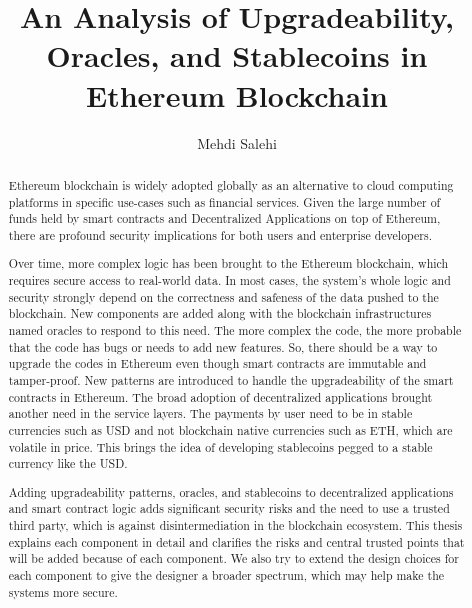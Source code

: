 \documentclass[letterpaper,12pt,onecolumn,final]{report}
\author{Mehdi Salehi}
\title{An Analysis of Upgradeability, Oracles, and Stablecoins in Ethereum Blockchain}
\begin{document}
\begin{abstract}
{%

Ethereum blockchain is widely adopted globally as an alternative to cloud computing platforms in specific use-cases such as financial services. Given the large number of funds held by smart contracts and Decentralized Applications on top of Ethereum, there are profound security implications for both users and enterprise developers.

Over time, more complex logic has been brought to the Ethereum blockchain, which requires secure access to real-world data. In most cases, the system's whole logic and security strongly depend on the correctness and safeness of the data pushed to the blockchain. New components are added along with the blockchain infrastructures named oracles to respond to this need.
The more complex the code, the more probable that the code has bugs or needs to add new features. So, there should be a way to upgrade the codes in Ethereum even though smart contracts are immutable and tamper-proof. New patterns are introduced to handle the upgradeability of the smart contracts in Ethereum. The broad adoption of decentralized applications brought another need in the service layers. The payments by user need to be in stable currencies such as USD and not blockchain native currencies such as ETH, which are volatile in price. This brings the idea of developing stablecoins pegged to a stable currency like the USD.

Adding upgradeability patterns, oracles, and stablecoins to decentralized applications and smart contract logic adds significant security risks and the need to use a trusted third party, which is against disintermediation in the blockchain ecosystem. This thesis explains each component in detail and clarifies the risks and central trusted points that will be added because of each component. We also try to extend the design choices for each component to give the designer a broader spectrum, which may help make the systems more secure.   


}
\end{abstract}
\end{document}

